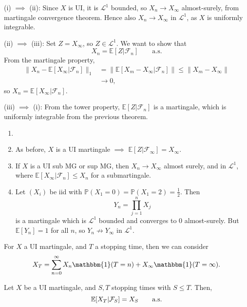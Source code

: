 \documentclass[12pt]{article}
\begin{document}
\begin{proofbox}
	

	(i) $\implies$ (ii): Since $X$ is UI, it is $\mathcal{L}^1$ bounded, so $X_n \to X_\infty$ almost-surely, from martingale convergence theorem. Hence also $X_n \to X_\infty$ in $\mathcal{L}^1$, as $X$ is uniformly integrable.

	(ii) $\implies$ (iii): Set $Z = X_\infty$, so $Z \in \mathcal{L}^1$. We want to show that
	\[
		X_n = \mathbb{E}[Z | \mathcal{F}_n] \qquad \text{a.s.}
	\]
	From the martingale property,
	\begin{align*}
		\|X_n - \mathbb{E}[X_\infty | \mathcal{F}_n]\|_1 &= \|\mathbb{E}[X_m -X_\infty | \mathcal{F}_n]\| \leq \|X_m - X_\infty\| \\
								 &\to 0,
	\end{align*}
	so $X_n = \mathbb{E}[X_\infty | \mathcal{F}_n]$.

	(iii) $\implies$ (i): From the tower property, $\mathbb{E}[Z|\mathcal{F}_n]$ is a martingale, which is uniformly integrable from the previous theorem.
\end{proofbox}

\begin{remark}
	\begin{enumerate}
		\item[]
		\item As before, $X$ is a UI martingale $\implies$ $\mathbb{E}[Z | \mathcal{F}_\infty] = X_\infty$.
		\item If $X$ is a UI sub MG or sup MG, then $X_n \to X_\infty$ almost surely, and in $\mathcal{L}^1$, where $\mathbb{E}[X_\infty | \mathcal{F}_n] \leq X_n$ for a submartingale.
		\item Let $(X_i)$ be iid with $\mathbb{P}(X_1 = 0) = \mathbb{P}(X_1 = 2) = \frac{1}{2}$. Then
			\[
			Y_n = \prod_{j = 1}^n X_j
			\]
			is a martingale which is $\mathcal{L}^1$ bounded and converges to $0$ almost-surely. But $\mathbb{E}[Y_n] = 1$ for all $n$, so $Y_n \not \to Y_\infty$ in $\mathcal{L}^1$.
	\end{enumerate}
\end{remark}

For $X$ a UI martingale, and $T$ a stopping time, then we can consider
\[
X_T = \sum_{n = 0}^{\infty} X_n \mathbbm{1}(T=n) + X_\infty \mathbbm{1}(T = \infty).
\]
\begin{theorem}
	Let $X$ be a UI martingale, and $S, T$ stopping times with $S \leq T$. Then,
	\[
		\mathbb{E}[X_T | \mathcal{F}_S] = X_S \qquad\text{\normalfont{a.s.}}
	\]
\end{theorem}
\end{document}
